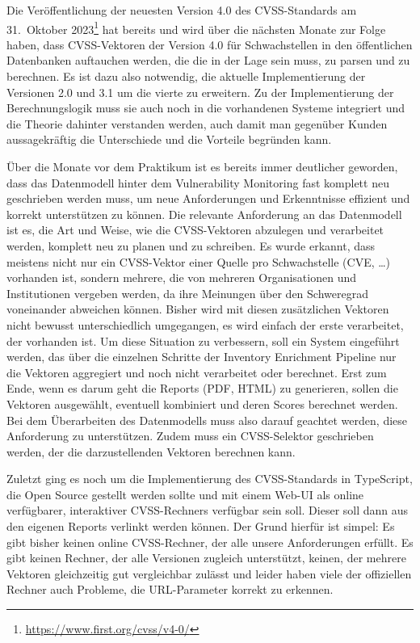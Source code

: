 \begin{smitemize}
    \item Die Veröffentlichung der neuesten Version 4.0 des CVSS-Standards am 31.\ Oktober 2023\footnote{\url{https://www.first.org/cvss/v4-0/}} hat bereits und wird über die nächsten Monate zur Folge haben, dass CVSS-Vektoren der Version 4.0 für Schwachstellen in den öffentlichen Datenbanken auftauchen werden, die die {\metaeffekt} in der Lage sein muss, zu parsen und zu berechnen.
    Es ist dazu also notwendig, die aktuelle Implementierung der Versionen 2.0 und 3.1 um die vierte zu erweitern.
    Zu der Implementierung der Berechnungslogik muss sie auch noch in die vorhandenen Systeme integriert und die Theorie dahinter verstanden werden, auch damit man gegenüber Kunden aussagekräftig die Unterschiede und die Vorteile begründen kann.
    \item Über die Monate vor dem Praktikum ist es bereits immer deutlicher geworden, dass das Datenmodell hinter dem Vulnerability Monitoring fast komplett neu geschrieben werden muss, um neue Anforderungen und Erkenntnisse effizient und korrekt unterstützen zu können.
    Die relevante Anforderung an das Datenmodell ist es, die Art und Weise, wie die CVSS-Vektoren abzulegen und verarbeitet werden, komplett neu zu planen und zu schreiben.
    Es wurde erkannt, dass meistens nicht nur ein CVSS-Vektor einer Quelle pro Schwachstelle (CVE, \ldots) vorhanden ist, sondern mehrere, die von mehreren Organisationen und Institutionen vergeben werden, da ihre Meinungen über den Schweregrad voneinander abweichen können.
    Bisher wird mit diesen zusätzlichen Vektoren nicht bewusst unterschiedlich umgegangen, es wird einfach der erste verarbeitet, der vorhanden ist.
    Um diese Situation zu verbessern, soll ein System eingeführt werden, das über die einzelnen Schritte der Inventory Enrichment Pipeline nur die Vektoren aggregiert und noch nicht verarbeitet oder berechnet.
    Erst zum Ende, wenn es darum geht die Reports (PDF, HTML) zu generieren, sollen die Vektoren ausgewählt, eventuell kombiniert und deren Scores berechnet werden.
    Bei dem Überarbeiten des Datenmodells muss also darauf geachtet werden, diese Anforderung zu unterstützen.
    Zudem muss ein CVSS-Selektor geschrieben werden, der die darzustellenden Vektoren berechnen kann.
    \item Zuletzt ging es noch um die Implementierung des CVSS-Standards in TypeScript, die Open Source gestellt werden sollte und mit einem Web-UI als online verfügbarer, interaktiver CVSS-Rechners verfügbar sein soll.
    Dieser soll dann aus den eigenen Reports verlinkt werden können.
    Der Grund hierfür ist simpel: Es gibt bisher keinen online CVSS-Rechner, der alle unsere Anforderungen erfüllt.
    Es gibt keinen Rechner, der alle Versionen zugleich unterstützt, keinen, der mehrere Vektoren gleichzeitig gut vergleichbar zulässt und leider haben viele der offiziellen Rechner auch Probleme, die URL-Parameter korrekt zu erkennen.
\end{smitemize}

